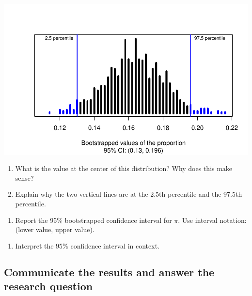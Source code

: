\documentclass[
]{report}
\providecommand{\tightlist}{%
  \setlength{\itemsep}{0pt}\setlength{\parskip}{0pt}}
\begin{document}
\begin{center}\includegraphics[width=0.7\linewidth]{06-inference-1cat_files/figure-latex/unnamed-chunk-6-1} \end{center}

\begin{enumerate}
\def\labelenumi{\arabic{enumi}.}
\setcounter{enumi}{24}
\item
  What is the value at the center of this distribution? Why does this make sense?
  \vspace{1in}
\item
  Explain why the two vertical lines are at the 2.5th percentile and the 97.5th percentile.
\end{enumerate}

\vspace{1in}

\begin{enumerate}
\def\labelenumi{\arabic{enumi}.}
\setcounter{enumi}{26}
\tightlist
\item
  Report the 95\% bootstrapped confidence interval for \(\pi\). Use interval notation: (lower value, upper value).
\end{enumerate}

\vspace{1in}

\begin{enumerate}
\def\labelenumi{\arabic{enumi}.}
\setcounter{enumi}{27}
\tightlist
\item
  Interpret the 95\% confidence interval in context.
\end{enumerate}

\vspace{1in}

\hypertarget{communicate-the-results-and-answer-the-research-question}{%
\subsection{Communicate the results and answer the research question}\label{communicate-the-results-and-answer-the-research-question}}
\end{document}
